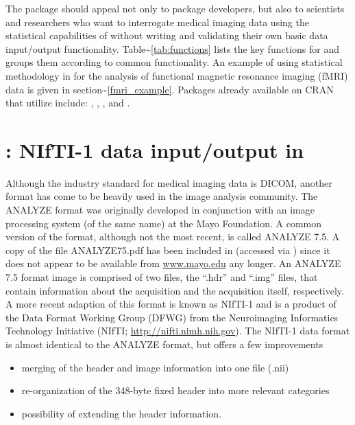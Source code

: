 \documentclass[
]{jss}
\begin{document}
The  package should appeal not only to 
package developers, but also to scientists and researchers who want to
interrogate medical imaging data using the statistical capabilities of
 without writing and validating their own basic data
input/output functionality. Table\textasciitilde{}\ref{tab:functions}
lists the key functions for  and groups them according to
common functionality. An example of using statistical methodology in
 for the analysis of functional magnetic resonance imaging
(fMRI) data is given in section\textasciitilde{}\ref{fmri_example}.
Packages already available on CRAN that utilize  include:
 \citep{daSilva:JSS}, 
\citep{whi-sch:JSS},  \citep{dpmixsim}, and
 \citep{RNiftyReg}.

\section[oro.nifti: NIfTI-1 data input/output in R]{: NIfTI-1 data input/output in }

Although the industry standard for medical imaging data is DICOM,
another format has come to be heavily used in the image analysis
community. The ANALYZE format was originally developed in conjunction
with an image processing system (of the same name) at the Mayo
Foundation. A common version of the format, although not the most
recent, is called ANALYZE 7.5. A copy of the file ANALYZE75.pdf has been
included in  (accessed via
) since it
does not appear to be available from \url{www.mayo.edu} any longer. An
ANALYZE 7.5 format image is comprised of two files, the ``.hdr'' and
``.img'' files, that contain information about the acquisition and the
acquisition itself, respectively. A more recent adaption of this format
is known as NIfTI-1 and is a product of the Data Format Working Group
(DFWG) from the Neuroimaging Informatics Technology Initiative (NIfTI;
\url{http://nifti.nimh.nih.gov}). The NIfTI-1 data format is almost
identical to the ANALYZE format, but offers a few improvements

\begin{itemize}
  \item merging of the header and image information
    into one file (.nii)
  \item re-organization of the 348-byte fixed header into more
    relevant categories 
  \item possibility of extending the header information.
\end{itemize}
\end{document}
